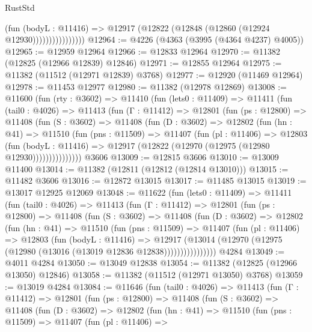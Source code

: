 \begin{lexlean}{RustStd}
\begin{coremodule}
                          (fun (bodyL : @11416) =>
                          @12917 (@12822 (@12848 (@12860 (@12924 @12930))))))))))))))))
@12964 := @4226 (@4363 (@3995 (@4364 @4237) @4005))
@12965 := @12959 @12964
@12966 := @12833 @12964
@12970 := @11382 (@12825 (@12966 @12839) @12846)
@12971 := @12855 @12964
@12975 := @11382 (@11512 (@12971 @12839) @3768)
@12977 := @12920 (@11469 @12964)
@12978 := @11453 @12977
@12980 := @11382 (@12978 @12869)
@13008 := @11600
    (fun (rty : @3602) =>
    @11410
      (fun (lets0 : @11409) =>
      @11411
        (fun (tail0 : @4026) =>
        @11413
          (fun (Γ : @11412) =>
          @12801
            (fun (ps : @12800) =>
            @11408
              (fun (S : @3602) =>
              @11408
                (fun (D : @3602) =>
                @12802
                  (fun (hn : @41) =>
                  @11510
                    (fun (pns : @11509) =>
                    @11407
                      (fun (pl : @11406) =>
                      @12803
                        (fun (bodyL : @11416) =>
                        @12917 (@12822 (@12970 (@12975 (@12980 @12930)))))))))))))))
    @3606
@13009 := @12815 @3606
@13010 := @13009 @11400
@13014 := @11382 (@12811 (@12812 (@12814 @13010)))
@13015 := @11482 @3606
@13016 := @12872 @13015
@13017 := @11485 @13015
@13019 := @13017 @12925 @12069
@13048 := @11622
    (fun (lets0 : @11409) =>
    @11411
      (fun (tail0 : @4026) =>
      @11413
        (fun (Γ : @11412) =>
        @12801
          (fun (ps : @12800) =>
          @11408
            (fun (S : @3602) =>
            @11408
              (fun (D : @3602) =>
              @12802
                (fun (hn : @41) =>
                @11510
                  (fun (pns : @11509) =>
                  @11407
                    (fun (pl : @11406) =>
                    @12803
                      (fun (bodyL : @11416) =>
                      @12917
                        (@13014
                          (@12970 (@12975 (@12980 (@13016 (@13019 @12836 @12838))))))))))))))))
    @4284
@13049 := @4011 @4284
@13050 := @13049 @12838
@13054 := @11382 (@12825 (@12966 @13050) @12846)
@13058 := @11382 (@11512 (@12971 @13050) @3768)
@13059 := @13019 @4284
@13084 := @11646
    (fun (tail0 : @4026) =>
    @11413
      (fun (Γ : @11412) =>
      @12801
        (fun (ps : @12800) =>
        @11408
          (fun (S : @3602) =>
          @11408
            (fun (D : @3602) =>
            @12802
              (fun (hn : @41) =>
              @11510
                (fun (pns : @11509) =>
                @11407
                  (fun (pl : @11406) =>

\end{coremodule}
\end{lexlean}
